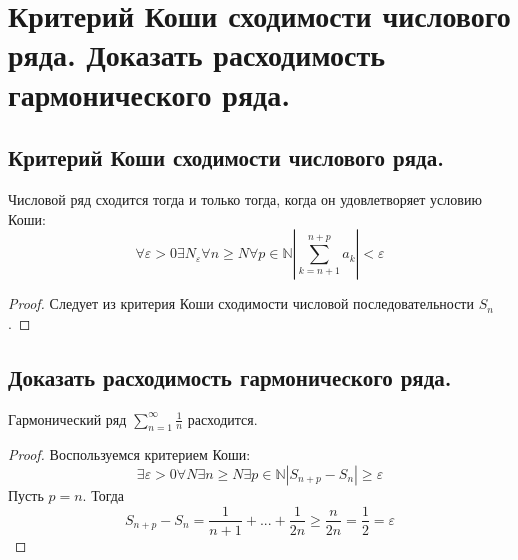 \section{Критерий Коши сходимости числового ряда. Доказать расходимость гармонического ряда.}

\subsection{Критерий Коши сходимости числового ряда.}
\begin{theorem}
    Числовой ряд сходится тогда и только тогда, когда он удовлетворяет условию Коши:
    \[
        \forall \varepsilon > 0
        \exists N_{\varepsilon}
        \forall n \geqslant N
        \forall p \in \mathbb{N}
        \left|
            \sum_{k=n+1}^{n+p} a_k
        \right| < \varepsilon
    \]
    \begin{proof}
        Следует из критерия Коши сходимости числовой последовательности $S_n$.
    \end{proof}
\end{theorem}

\subsection{Доказать расходимость гармонического ряда.}
\begin{theorem}
    Гармонический ряд $\sum_{n=1}^{\infty} \frac{1}{n}$ расходится.
    \begin{proof}
        Воспользуемся критерием Коши:
        \[
            \exists \varepsilon > 0
            \forall N
            \exists n \geqslant N
            \exists p \in \mathbb{N}
            |S_{n+p} - S_n| \geqslant \varepsilon
        \]
        Пусть $p=n$. Тогда
        \[
            S_{n+p} - S_{n} =
            \frac{1}{n+1} + ... + \frac{1}{2n} \geqslant
            \frac{n}{2n} = \frac{1}{2} = \varepsilon
        \]
    \end{proof}
\end{theorem}